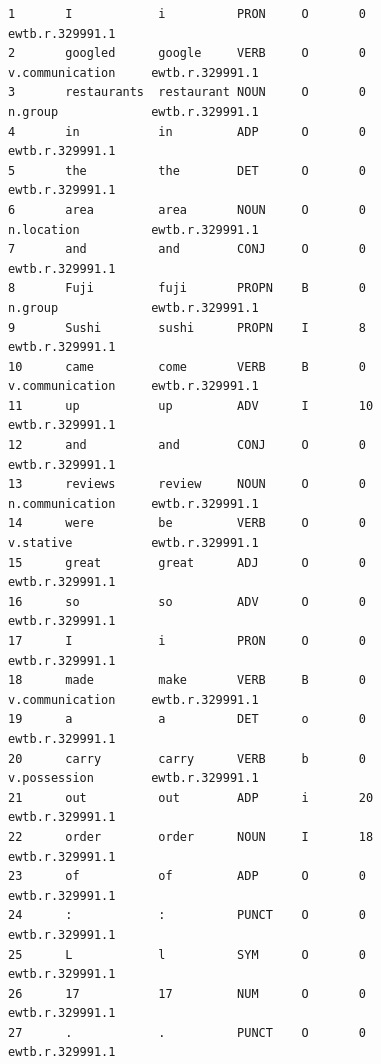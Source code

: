 \documentclass[11pt,letterpaper]{article}
\begin{document}
\begin{figure}
\begin{verbatim}
1       I            i          PRON     O       0                                   ewtb.r.329991.1
2       googled      google     VERB     O       0               v.communication     ewtb.r.329991.1
3       restaurants  restaurant NOUN     O       0               n.group             ewtb.r.329991.1
4       in           in         ADP      O       0                                   ewtb.r.329991.1
5       the          the        DET      O       0                                   ewtb.r.329991.1
6       area         area       NOUN     O       0               n.location          ewtb.r.329991.1
7       and          and        CONJ     O       0                                   ewtb.r.329991.1
8       Fuji         fuji       PROPN    B       0               n.group             ewtb.r.329991.1
9       Sushi        sushi      PROPN    I       8                                   ewtb.r.329991.1
10      came         come       VERB     B       0               v.communication     ewtb.r.329991.1
11      up           up         ADV      I       10                                  ewtb.r.329991.1
12      and          and        CONJ     O       0                                   ewtb.r.329991.1
13      reviews      review     NOUN     O       0               n.communication     ewtb.r.329991.1
14      were         be         VERB     O       0               v.stative           ewtb.r.329991.1
15      great        great      ADJ      O       0                                   ewtb.r.329991.1
16      so           so         ADV      O       0                                   ewtb.r.329991.1
17      I            i          PRON     O       0                                   ewtb.r.329991.1
18      made         make       VERB     B       0               v.communication     ewtb.r.329991.1
19      a            a          DET      o       0                                   ewtb.r.329991.1
20      carry        carry      VERB     b       0               v.possession        ewtb.r.329991.1
21      out          out        ADP      i       20                                  ewtb.r.329991.1
22      order        order      NOUN     I       18                                  ewtb.r.329991.1
23      of           of         ADP      O       0                                   ewtb.r.329991.1
24      :            :          PUNCT    O       0                                   ewtb.r.329991.1
25      L            l          SYM      O       0                                   ewtb.r.329991.1
26      17           17         NUM      O       0                                   ewtb.r.329991.1
27      .            .          PUNCT    O       0                                   ewtb.r.329991.1


\end{verbatim}
\end{figure}
\end{document}
